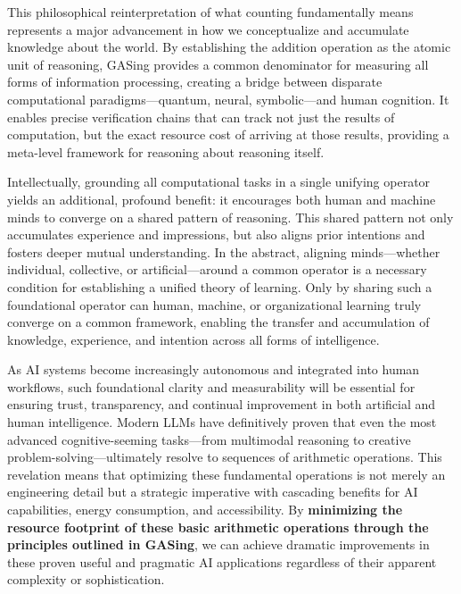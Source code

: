 \documentclass[11pt,a4paper]{article}
\begin{document}
This philosophical reinterpretation of what counting fundamentally means represents a major advancement in how we conceptualize and accumulate knowledge about the world. By establishing the addition operation as the atomic unit of reasoning, GASing provides a common denominator for measuring all forms of information processing, creating a bridge between disparate computational paradigms—quantum, neural, symbolic—and human cognition. It enables precise verification chains that can track not just the results of computation, but the exact resource cost of arriving at those results, providing a meta-level framework for reasoning about reasoning itself.

Intellectually, grounding all computational tasks in a single unifying operator yields an additional, profound benefit: it encourages both human and machine minds to converge on a shared pattern of reasoning. This shared pattern not only accumulates experience and impressions, but also aligns prior intentions and fosters deeper mutual understanding. In the abstract, aligning minds—whether individual, collective, or artificial—around a common operator is a necessary condition for establishing a unified theory of learning. Only by sharing such a foundational operator can human, machine, or organizational learning truly converge on a common framework, enabling the transfer and accumulation of knowledge, experience, and intention across all forms of intelligence.

As AI systems become increasingly autonomous and integrated into human workflows, such foundational clarity and measurability will be essential for ensuring trust, transparency, and continual improvement in both artificial and human intelligence. Modern LLMs have definitively proven that even the most advanced cognitive-seeming tasks—from multimodal reasoning to creative problem-solving—ultimately resolve to sequences of arithmetic operations. This revelation means that optimizing these fundamental operations is not merely an engineering detail but a strategic imperative with cascading benefits for AI capabilities, energy consumption, and accessibility. By \textbf{minimizing the resource footprint of these basic arithmetic operations through the principles outlined in GASing}, we can achieve dramatic improvements in these proven useful and pragmatic AI applications regardless of their apparent complexity or sophistication.
\end{document}
